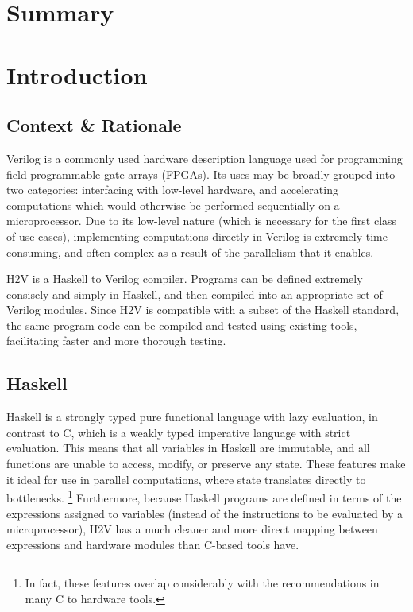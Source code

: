 \documentclass[english,onecolumn]{scrartcl}
\begin{document}
\begin{titlepage}

\end{titlepage}


\section{Summary}

\section{Introduction}

\subsection{Context \& Rationale}
Verilog is a commonly used hardware description language used for programming field programmable gate arrays (FPGAs).
Its uses may be broadly grouped into two categories: interfacing with low-level hardware, and accelerating computations which
would otherwise be performed sequentially on a microprocessor. Due to its low-level nature (which is necessary for the first class
of use cases), implementing computations directly in Verilog is extremely time consuming, and often complex as a result of the
parallelism that it enables.

H2V is a Haskell to Verilog compiler. Programs can be defined extremely consisely and simply in Haskell, and then compiled into an
appropriate set of Verilog modules. Since H2V is compatible with a subset of the Haskell standard, the same program code can be
compiled and tested using existing tools, facilitating faster and more thorough testing.

\subsection{Haskell}
Haskell is a strongly typed pure functional language with lazy evaluation, in contrast to C, which is a weakly typed imperative
language with strict evaluation. This means that all variables in Haskell are immutable, and all functions are unable to access,
modify, or preserve any state. These features make it ideal for use in parallel computations, where state translates directly to
bottlenecks.%
\footnote{In fact, these features overlap considerably with the recommendations in many C to hardware tools.\cite{C2H_UG}}
Furthermore, because Haskell programs are defined in terms of the expressions assigned to variables (instead of the instructions
to be evaluated by a microprocessor), H2V has a much cleaner and more direct mapping between expressions and hardware modules than
C-based tools have.
\end{document}
